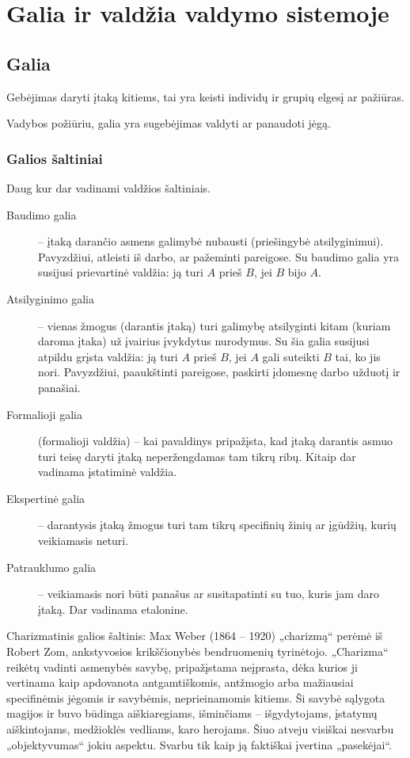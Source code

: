 \chapter{Galia ir valdžia valdymo sistemoje}

\section{Galia}

\begin{defn}[Galia]
  Gebėjimas daryti įtaką kitiems, tai yra keisti individų ir grupių
  elgesį ar pažiūras.
\end{defn}

Vadybos požiūriu, galia yra sugebėjimas valdyti ar panaudoti jėgą.

\subsection{Galios šaltiniai}

Daug kur dar vadinami valdžios šaltiniais.

\begin{description}
  \item[Baudimo galia] – įtaką darančio asmens galimybė nubausti
    (priešingybė atsilyginimui). Pavyzdžiui, atleisti iš darbo,
    ar pažeminti pareigose. Su baudimo galia yra susijusi prievartinė
    valdžia: ją turi $A$ prieš $B$, jei $B$ bijo $A$.
  \item[Atsilyginimo galia] – vienas žmogus (darantis įtaką) turi
    galimybę atsilyginti kitam (kuriam daroma įtaka) už įvairius
    įvykdytus nurodymus. Su šia galia susijusi atpildu grįsta
    valdžia: ją turi $A$ prieš $B$, jei $A$ gali suteikti $B$
    tai, ko jis nori. Pavyzdžiui, paaukštinti pareigose, paskirti
    įdomesnę darbo užduotį ir panašiai.
  \item[Formalioji galia] (formalioji valdžia) – kai pavaldinys
    pripažįsta, kad įtaką darantis asmuo turi teisę daryti įtaką
    neperžengdamas tam tikrų ribų. Kitaip dar vadinama įstatiminė
    valdžia.
  \item[Ekspertinė galia] – darantysis įtaką žmogus turi tam tikrų
    specifinių žinių ar įgūdžių, kurių veikiamasis neturi.
  \item[Patrauklumo galia] – veikiamasis nori būti panašus ar
    susitapatinti su tuo, kuris jam daro įtaką. Dar vadinama
    etalonine.
\end{description}

Charizmatinis galios šaltinis: Max Weber (1864 – 1920) „charizmą“ perėmė
iš Robert Zom, ankstyvosios krikščionybės bendruomenių tyrinėtojo.
„Charizma“ reikėtų vadinti asmenybės savybę, pripažįstama neįprasta,
dėka kurios ji vertinama kaip apdovanota antgamtiškomis, antžmogio
arba mažiausiai specifinėmis jėgomis ir savybėmis, neprieinamomis
kitiems. Ši savybė sąlygota magijos ir buvo būdinga aiškiaregiams,
išminčiams – išgydytojams, įstatymų aiškintojams, medžioklės vedliams,
karo herojams. Šiuo atveju visiškai nesvarbu „objektyvumas“ jokiu
aspektu. Svarbu tik kaip ją faktiškai įvertina „pasekėjai“.


